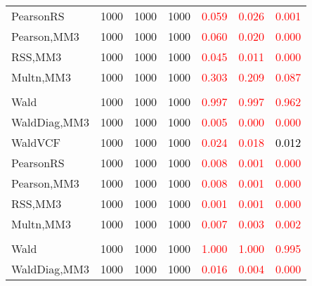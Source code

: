 \documentclass[
]{article}
\begin{document}
\begin{table}[H]
{\begin{tabular}[t]{lrrrrrr}
\hspace{1em}PearsonRS & 1000 & 1000 & 1000 & \textcolor{red}{0.059} & \textcolor{red}{0.026} & \textcolor{red}{0.001}\\
\hspace{1em}Pearson,MM3 & 1000 & 1000 & 1000 & \textcolor{red}{0.060} & \textcolor{red}{0.020} & \textcolor{red}{0.000}\\
\hspace{1em}RSS,MM3 & 1000 & 1000 & 1000 & \textcolor{red}{0.045} & \textcolor{red}{0.011} & \textcolor{red}{0.000}\\
\hspace{1em}Multn,MM3 & 1000 & 1000 & 1000 & \textcolor{red}{0.303} & \textcolor{red}{0.209} & \textcolor{red}{0.087}\\
\addlinespace[0.3em]
\multicolumn{7}{l}{\textbf{1F 15V}}\\
\hspace{1em}Wald & 1000 & 1000 & 1000 & \textcolor{red}{0.997} & \textcolor{red}{0.997} & \textcolor{red}{0.962}\\
\hspace{1em}WaldDiag,MM3 & 1000 & 1000 & 1000 & \textcolor{red}{0.005} & \textcolor{red}{0.000} & \textcolor{red}{0.000}\\
\hspace{1em}WaldVCF & 1000 & 1000 & 1000 & \textcolor{red}{0.024} & \textcolor{red}{0.018} & \textcolor{black}{0.012}\\
\hspace{1em}PearsonRS & 1000 & 1000 & 1000 & \textcolor{red}{0.008} & \textcolor{red}{0.001} & \textcolor{red}{0.000}\\
\hspace{1em}Pearson,MM3 & 1000 & 1000 & 1000 & \textcolor{red}{0.008} & \textcolor{red}{0.001} & \textcolor{red}{0.000}\\
\hspace{1em}RSS,MM3 & 1000 & 1000 & 1000 & \textcolor{red}{0.001} & \textcolor{red}{0.001} & \textcolor{red}{0.000}\\
\hspace{1em}Multn,MM3 & 1000 & 1000 & 1000 & \textcolor{red}{0.007} & \textcolor{red}{0.003} & \textcolor{red}{0.002}\\
\addlinespace[0.3em]
\multicolumn{7}{l}{\textbf{2F 10V}}\\
\hspace{1em}Wald & 1000 & 1000 & 1000 & \textcolor{red}{1.000} & \textcolor{red}{1.000} & \textcolor{red}{0.995}\\
\hspace{1em}WaldDiag,MM3 & 1000 & 1000 & 1000 & \textcolor{red}{0.016} & \textcolor{red}{0.004} & \textcolor{red}{0.000}\\

\end{tabular}}
\end{table}
\end{document}
